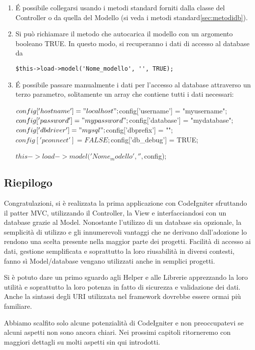 \begin{enumerate}
\item \'E possibile collegarsi usando i metodi standard forniti dalla classe del Controller o da quella del Modello (si veda i metodi standard\vref{sec:metodidb}).
\item Si può richiamare il metodo che autocarica il modello con un argomento booleano TRUE. In questo modo, si recuperanno i dati di accesso al database da 

\verb|$this->load->model('Nome_modello', '', TRUE);|

\item \'E possibile passare manualmente i dati per l'accesso al database attraverso un terzo parametro, solitamente un array che contiene tutti i dati necessari:

\begin{code}
$config['hostname'] = "localhost";
$config['username'] = "myusername";
$config['password'] = "mypassword";
$config['database'] = "mydatabase";
$config['dbdriver'] = "mysql";
$config['dbprefix'] = "";
$config['pconnect'] = FALSE;
$config['db_debug'] = TRUE;

$this->load->model('Nome_modello', '', $config);
\end{code}
\end{enumerate}

\subsection{Riepilogo}
Congratulazioni, si è realizzata la prima applicazione con CodeIgniter sfruttando il patter \ac{MVC}, utilizzando il Controller, la View e interfacciandosi con un database grazie al Model. Nonostante l'utilizzo di un database sia opzionale, la semplicità di utilizzo e gli innumerevoli vantaggi che ne derivano dall'adozione lo rendono una scelta presente nella maggior parte dei progetti. Facilità di accesso ai dati, gestione semplificata e soprattutto la loro riusabilità in diversi contesti, fanno sì Model/database vengano utilizzati anche in semplici progetti. 

Si è potuto dare un primo sguardo agli Helper e alle Librerie apprezzando la loro utilità e soprattutto la loro potenza in fatto di sicurezza e validazione dei dati. Anche la sintassi degli \ac{URI} utilizzata nel framework dovrebbe essere ormai più familiare.

Abbiamo scalfito solo alcune potenzialità di CodeIgniter e non preoccupatevi se alcuni aspetti non sono ancora chiari. Nei prossimi capitoli ritorneremo con maggiori dettagli su molti aspetti sin qui introdotti.